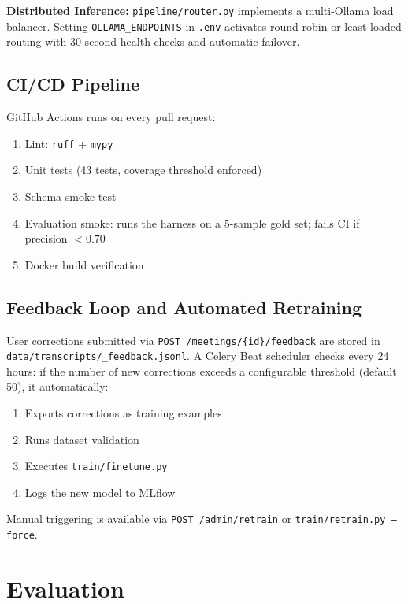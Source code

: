 \documentclass[12pt,a4paper]{article}
\begin{document}
\textbf{Distributed Inference:} \texttt{pipeline/router.py} implements a multi-Ollama load balancer. Setting \texttt{OLLAMA\_ENDPOINTS} in \texttt{.env} activates round-robin or least-loaded routing with 30-second health checks and automatic failover.

\subsection{CI/CD Pipeline}

GitHub Actions runs on every pull request:
\begin{enumerate}
    \item Lint: \texttt{ruff} + \texttt{mypy}
    \item Unit tests (43 tests, coverage threshold enforced)
    \item Schema smoke test
    \item Evaluation smoke: runs the harness on a 5-sample gold set; fails CI if precision $< 0.70$
    \item Docker build verification
\end{enumerate}

\subsection{Feedback Loop and Automated Retraining}

User corrections submitted via \texttt{POST /meetings/\{id\}/feedback} are stored in \texttt{data/transcripts/\_feedback.jsonl}. A Celery Beat scheduler checks every 24 hours: if the number of new corrections exceeds a configurable threshold (default 50), it automatically:
\begin{enumerate}
    \item Exports corrections as training examples
    \item Runs dataset validation
    \item Executes \texttt{train/finetune.py}
    \item Logs the new model to MLflow
\end{enumerate}
Manual triggering is available via \texttt{POST /admin/retrain} or \texttt{train/retrain.py --force}.

\section{Evaluation}
\end{document}
